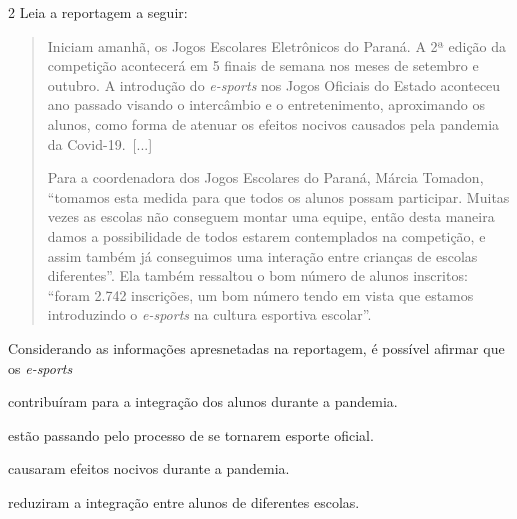 
\num{2}  Leia a reportagem a seguir:

\begin{quote}
Iniciam amanhã, os Jogos Escolares Eletrônicos do Paraná. A 2ª edição da
competição acontecerá em 5 finais de semana nos meses de setembro e
outubro. A introdução do \textit{e-sports} nos Jogos Oficiais do Estado aconteceu
ano passado visando o intercâmbio e o entretenimento, aproximando os
alunos, como forma de atenuar os efeitos nocivos causados pela pandemia
da Covid-19.~{[}...{]}

Para a coordenadora dos Jogos Escolares do Paraná, Márcia Tomadon,
``tomamos esta medida para que todos os alunos possam participar. Muitas
vezes as escolas não conseguem montar uma equipe, então desta maneira
damos a possibilidade de todos estarem contemplados na competição, e
assim também já conseguimos uma interação entre crianças de escolas
diferentes''. Ela também ressaltou o bom número de alunos inscritos:
``foram 2.742 inscrições, um bom número tendo em vista que estamos
introduzindo o \textit{e-sports} na cultura esportiva escolar''.

\end{quote}

Considerando as informações apresnetadas na reportagem, é possível afirmar
que os \textit{e-sports}

\begin{escolha}
\item contribuíram para a integração dos alunos durante a pandemia.

\item estão passando pelo processo de se tornarem esporte oficial.  

\item causaram efeitos nocivos durante a pandemia.

\item reduziram a integração entre alunos de diferentes escolas.
\end{escolha}

